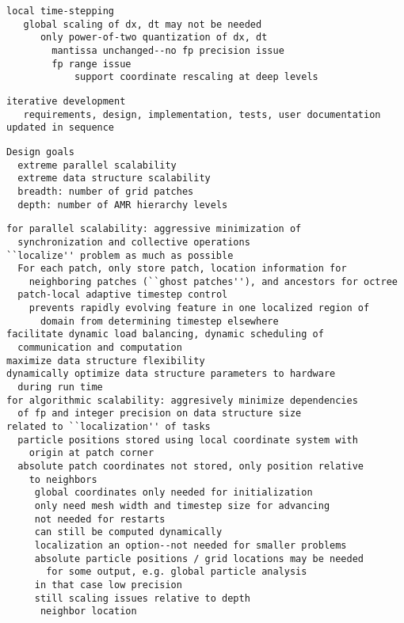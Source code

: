 \documentclass{article}
\begin{document}
\begin{verbatim}
local time-stepping
   global scaling of dx, dt may not be needed
      only power-of-two quantization of dx, dt
        mantissa unchanged--no fp precision issue
        fp range issue
            support coordinate rescaling at deep levels
\end{verbatim}

\begin{verbatim}
iterative development
   requirements, design, implementation, tests, user documentation updated in sequence
\end{verbatim}

\begin{verbatim}
Design goals
  extreme parallel scalability
  extreme data structure scalability
  breadth: number of grid patches
  depth: number of AMR hierarchy levels
\end{verbatim}

\begin{verbatim}
for parallel scalability: aggressive minimization of
  synchronization and collective operations
``localize'' problem as much as possible
  For each patch, only store patch, location information for
    neighboring patches (``ghost patches''), and ancestors for octree
  patch-local adaptive timestep control
    prevents rapidly evolving feature in one localized region of
      domain from determining timestep elsewhere
facilitate dynamic load balancing, dynamic scheduling of
  communication and computation
maximize data structure flexibility
dynamically optimize data structure parameters to hardware
  during run time
for algorithmic scalability: aggresively minimize dependencies
  of fp and integer precision on data structure size
related to ``localization'' of tasks
  particle positions stored using local coordinate system with
    origin at patch corner
  absolute patch coordinates not stored, only position relative
    to neighbors
     global coordinates only needed for initialization
     only need mesh width and timestep size for advancing
     not needed for restarts
     can still be computed dynamically
     localization an option--not needed for smaller problems
     absolute particle positions / grid locations may be needed
       for some output, e.g. global particle analysis
     in that case low precision
     still scaling issues relative to depth
      neighbor location
\end{verbatim}

\end{document}
